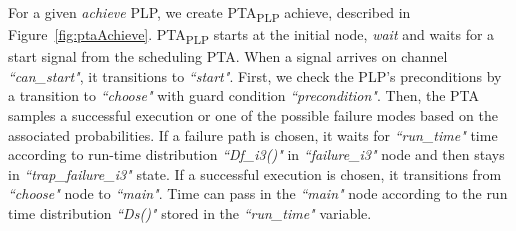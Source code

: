 \documentclass[letterpaper]{article}
\newcommand\rNote[1]{\todo[inline, author=Ronen, color=yellow]{#1}}
\newcommand\aNote[1]{\todo[inline, author=Alex, color=GreenYellow]{#1}}
\newcommand{\frameImage}[4]{
\begin{figure}[H] 
  \centerline{
    \fcolorbox{frameColor}{white}{
        \texttt{[image: \#1]} } }
    \caption{#4}
    \label{fig:#1}
\end{figure}
}
\begin{document}





For a given \textit{achieve} PLP, we create PTA\textsubscript{PLP} achieve, described in Figure~\ref{fig:ptaAchieve}.
PTA\textsubscript{PLP} starts at the initial node, \textit{wait} and
waits for a start signal from the scheduling PTA. When a signal arrives on channel \textit{``can\_start"},
it transitions to \textit{``start"}.
First, we check the PLP's preconditions by a transition  to \textit{``choose"} with guard condition \textit{``precondition"}. Then,
the PTA samples a successful execution or one of the possible failure modes based on the associated probabilities.
If a failure path is chosen, it waits for \textit{``run\_time"} time according to run-time distribution \textit{``Df\_i3()"} in \textit{``failure\_i3"} node and then stays in \textit{``trap\_failure\_i3"} state. If a successful  execution is chosen, it transitions from \textit{``choose"} node to \textit{``main"}.  Time can pass in the \textit{``main"} node according to the run time distribution \textit{``Ds()"} stored in the \textit{``run\_time"} variable. 
\end{document}
